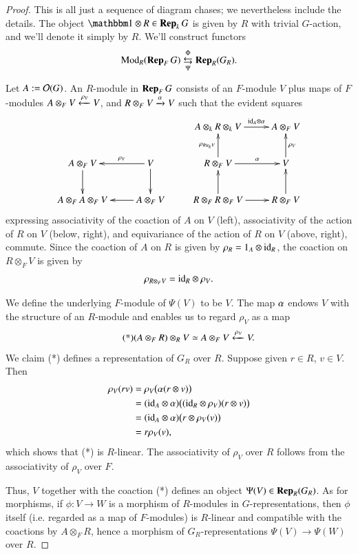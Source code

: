 \begin{proof}
This is all just a sequence of diagram chases; we nevertheless include the details. The object $\one \otimes R \in \Rep_k G$ is given by $R$ with trivial $G$-action, and we'll denote it simply by $R$. We'll construct functors
\[
\operatorname{Mod}_{R}(\operatorname{\bf{Rep}}_F G) 
\underset{\Psi}{\overset{\Phi}{\leftrightarrows}} 
\operatorname{\bf{Rep}}_R(G_R).
\]

Let $A:= \mathcal{O}(G)$. An $R$-module in $\operatorname{\bf{Rep}}_F G$ consists of an $F$-module $V$ plus maps of $F$-modules $A \otimes_F V \xleftarrow{\rho_V} V$, and $R \otimes_F V \xrightarrow{\alpha} V$ such that the evident squares
\[
\xymatrix{
&
				& A \otimes_k R \otimes_k V
				\ar[r]^-{\m{id}_A \otimes \al}
				& A \otimes_F V
\\
A \otimes_F V \ar[d]
& V \ar[l]_-{\rho_V} \ar[d] 
				& R\otimes_F V 
				\ar[r]^-\al 
				\ar[u]^-{\rho_{R\otimes_k V}} 
				& V \ar[u]_-{\rho_V}
\\
A\otimes_F A\otimes_F V 
& A\otimes_F V \ar[l]
				& R \otimes_F R \otimes_F V \ar[r] \ar[u] 
				& R \otimes_F V \ar[u]
}
\]
expressing associativity of the coaction of $A$ on $V$ (left), associativity of the action of $R$ on $V$ (below, right), and equivariance of the action of $R$ on $V$ (above, right), commute. Since the coaction of $A$ on $R$ is given by $\rho_R = 1_A \otimes \mathrm{id}_R$, the coaction on $R\otimes_F V$ is given by
\[
\rho_{R\otimes_F V} = \mathrm{id}_R \otimes \rho_V.
\]

We define the underlying $F$-module of $\Psi(V)$ to be $V$. The map $\alpha$ endows $V$ with the structure of an $R$-module and enables us to regard $\rho_V$ as a map
\[
\tag{*}
(A \otimes_F R) \otimes_R V 
\simeq A \otimes_F V \xleftarrow{\rho_V} V.
\]
We claim (*) defines a representation of $G_R$ over $R$. Suppose given $r \in R$, $v \in V$. Then
\begin{align*}
\rho_V(rv) &= \rho_V \big( \alpha(r \otimes v) \big)
\\
&= (\mathrm{id}_A \otimes \alpha)\big((\mathrm{id}_R \otimes \rho_V)(r\otimes v) \big)
\\
&= (\mathrm{id}_A \otimes \alpha) \big( r \otimes \rho_V(v) \big)
\\
&= r \rho_V(v),
\end{align*}
which shows that (*) is $R$-linear. The associativity of $\rho_V$ over $R$ follows from the associativity of $\rho_V$ over $F$. 

Thus, $V$ together with the coaction (*) defines an object $\Psi(V) \in \operatorname{\bf{Rep}}_R (G_R)$. As for morphisms, if $\phi: V \to W$ is a morphism of $R$-modules in $G$-representations, then $\phi$ itself (i.e. regarded as a map of $F$-modules) is $R$-linear and compatible with the coactions by $A \otimes_F R$, hence a morphism of $G_R$-representations $\Psi(V) \to \Psi(W)$ over $R$.


\end{proof}
